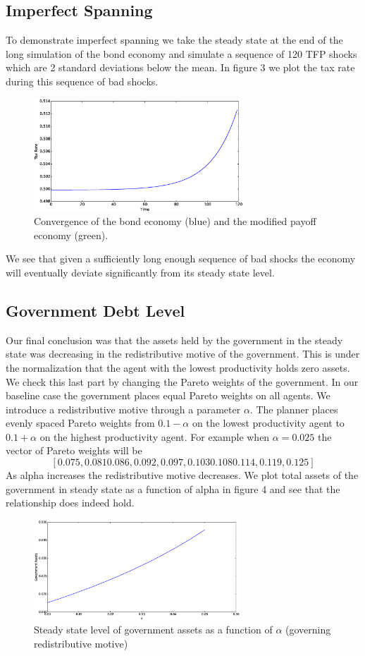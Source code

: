 \documentclass[thmsb,11pt]{article}
\begin{document}
\subsection{Imperfect Spanning}
To demonstrate imperfect spanning we take the steady state at the end of the long simulation of the bond economy and simulate a sequence of 120 TFP shocks which are 2 standard deviations below the mean.  In figure 3 we plot the tax rate during this sequence of bad shocks.
\begin{figure}[htp]
	\centering
	\includegraphics[width=0.7\textwidth]{Images/badshock.eps}
	\caption{Convergence of the bond economy (blue) and the modified payoff economy (green).}
\end{figure}  We see that given a sufficiently long enough sequence of bad shocks the economy will eventually deviate significantly from its steady state level.
\newpage
\subsection{Government Debt Level}  Our final conclusion was that the assets held by the government in the steady state was decreasing in the redistributive motive of the government.  This is under the normalization that the agent with the lowest productivity holds zero assets.  We check this last part by changing the Pareto weights of the government.  In our baseline case the government places equal Pareto weights on all agents.  We introduce a redistributive motive through a parameter $\alpha$.  The planner places evenly spaced Pareto weights from $0.1-\alpha$ on the lowest productivity agent to $0.1+\alpha$ on the highest productivity agent.  For example when $\alpha = 0.025$ the vector of Pareto weights will be
\[
[ 0.075     ,  0.081  0.086,  0.092,  0.097,
        0.103  0.108  0.114,  0.119 , 0.125     ]
\]As alpha increases the redistributive motive decreases.  We plot total assets of the government in steady state as a function of alpha in figure 4 and see that the relationship does indeed hold.
\begin{figure}[htp]
	\centering
	\includegraphics[width=0.69\textwidth]{Images/comp_statics.eps}
	\caption{Steady state level of government assets as a function of $\alpha$ (governing redistributive motive)}
\end{figure}
\end{document}

